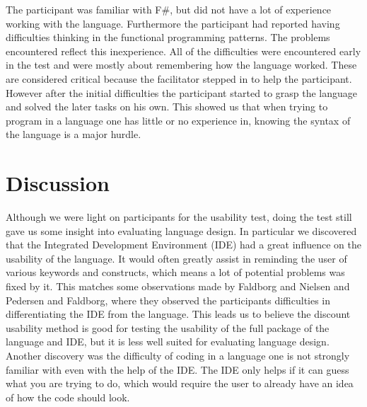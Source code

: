 The participant was familiar with F\#, but did not have a lot of experience working with the language.
Furthermore the participant had reported having difficulties thinking in the functional programming patterns.
The problems encountered reflect this inexperience.
All of the difficulties were encountered early in the test and were mostly about remembering how the language worked.
These are considered critical because the facilitator stepped in to help the participant.
However after the initial difficulties the participant started to grasp the language and solved the later tasks on his own.
This showed us that when trying to program in a language one has little or no experience in, knowing the syntax of the language is a major hurdle.

\chapter{Discussion}
Although we were light on participants for the usability test, doing the test still gave us some insight into evaluating language design.
In particular we discovered that the Integrated Development Environment (IDE) had a great influence on the usability of the language.
It would often greatly assist in reminding the user of various keywords and constructs, which means a lot of potential problems was fixed by it.
This matches some observations made by Faldborg and Nielsen \cite{DartTypeSys} and Pedersen and Faldborg\cite{LARM}, where they observed the participants difficulties in differentiating the IDE from the language. %
This leads us to believe the discount usability method is good for testing the usability of the full package of the language and IDE, but it is less well suited for evaluating language design.
Another discovery was the difficulty of coding in a language one is not strongly familiar with even with the help of the IDE.
The IDE only helps if it can guess what you are trying to do, which would require the user to already have an idea of how the code should look.
